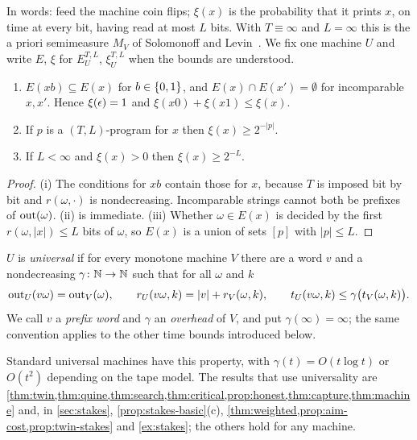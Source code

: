 In words: feed the machine coin flips; $\xi(x)$ is the probability that it prints $x$, on time at every bit,
having read at most $L$ bits. With $T\equiv\infty$ and $L=\infty$ this is the a priori semimeasure $M_V$ of
Solomonoff and Levin~\cite{lv}. We fix one machine $U$ and write $E$, $\xi$ for $E_U^{T,L}$, $\xi_U^{T,L}$
when
the bounds are understood.

\begin{lemma}\label{lem:basic}
\begin{enumerate}[label=(\roman*),leftmargin=2em,itemsep=1pt,topsep=2pt]
\item $E(xb)\subseteq E(x)$ for $b\in\{0,1\}$, and $E(x)\cap E(x')=\emptyset$ for incomparable $x,x'$. Hence
$\xi(\epsilon)=1$ and $\xi(x0)+\xi(x1)\le\xi(x)$.
\item If $p$ is a $(T,L)$-program for $x$ then $\xi(x)\ge2^{-|p|}$.
\item If $L<\infty$ and $\xi(x)>0$ then $\xi(x)\ge2^{-L}$.
\end{enumerate}
\end{lemma}
\begin{proof}
(i) The conditions for $xb$ contain those for $x$, because $T$ is imposed bit by bit and $r(\omega,\cdot)$ is
nondecreasing. Incomparable strings cannot both be prefixes of $\mathrm{out}(\omega)$. (ii) is immediate. (iii)
Whether
$\omega\in E(x)$ is decided by the first $r(\omega,|x|)\le L$ bits of $\omega$, so $E(x)$ is a union of sets
$[p]$ with $|p|\le L$.
\end{proof}

\begin{definition}\label{def:universal}
$U$ is \emph{universal} if for every monotone machine $V$ there are a word $v$ and a nondecreasing
$\gamma\colon\mathbb{N}\to\mathbb{N}$ such that for all $\omega$ and $k$
\[
\mathrm{out}_U(v\omega)=\mathrm{out}_V(\omega),\qquad r_U(v\omega,k)=|v|+r_V(\omega,k),\qquad
t_U(v\omega,k)\le\gamma\bigl(t_V(\omega,k)\bigr).
\]
We call $v$ a \emph{prefix word} and $\gamma$ an \emph{overhead} of $V$, and put $\gamma(\infty)=\infty$;
the same convention applies to the other time bounds introduced below.
\end{definition}

Standard universal machines have this property, with $\gamma(t)=O(t\log t)$ or $O(t^2)$ depending on the tape
model. The results that use universality are
\cref{thm:twin,thm:quine,thm:search,thm:critical,prop:honest,thm:capture,thm:machine} and, in
\cref{sec:stakes}, \cref{prop:stakes-basic}(c), \cref{thm:weighted,prop:aim-cost,prop:twin-stakes} and
\cref{ex:stakes}; the others hold for any machine.

